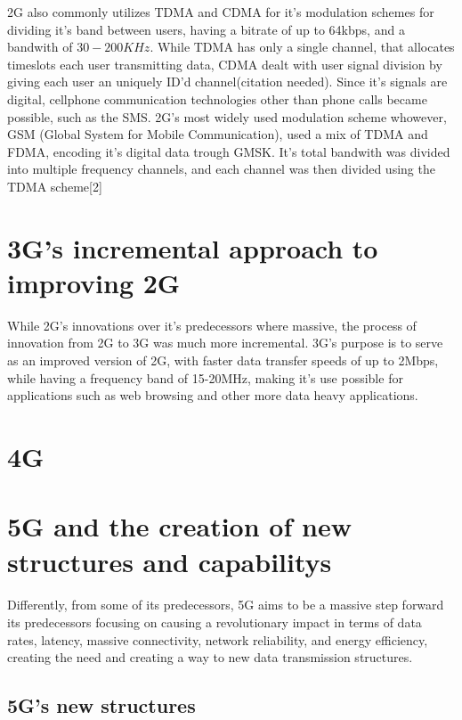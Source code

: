 \documentclass[10pt,journal,compsoc]{IEEEtran}
\begin{document}
2G also commonly utilizes TDMA and CDMA for it's modulation schemes for dividing it's band between users, having a bitrate of up to 64kbps, and a bandwith of $30-200KHz$. While TDMA has only a single channel, that allocates timeslots each user transmitting data, CDMA dealt with user signal division by giving each user an uniquely ID'd channel(citation needed). Since it's signals are digital, cellphone communication technologies other than phone calls became possible, such as the SMS. 2G's most widely used modulation scheme whowever, GSM (Global System for Mobile Communication), used a mix of TDMA and FDMA, encoding it's digital data trough GMSK. It's total bandwith was divided into multiple frequency channels, and each channel was then divided using the TDMA scheme[2]

\section{3G's incremental approach to improving 2G}
While 2G's innovations over it's predecessors where massive, the process of innovation from 2G to 3G was much more incremental. 3G's purpose is to serve as an improved version of 2G, with faster data transfer speeds of up to 2Mbps, while having a frequency band of 15-20MHz, making it's use possible for applications such as web browsing and other more data heavy applications.

\section{4G}


\section{5G and the creation of new structures and capabilitys}
\paragraph{}
Differently, from some of its predecessors, 5G aims to be a massive step forward its predecessors focusing on causing a revolutionary impact in terms of data rates, latency, massive connectivity, network reliability, and energy efficiency, creating the need and creating a way to new data transmission structures.\par
\subsection*{5G's new structures}
\end{document}
